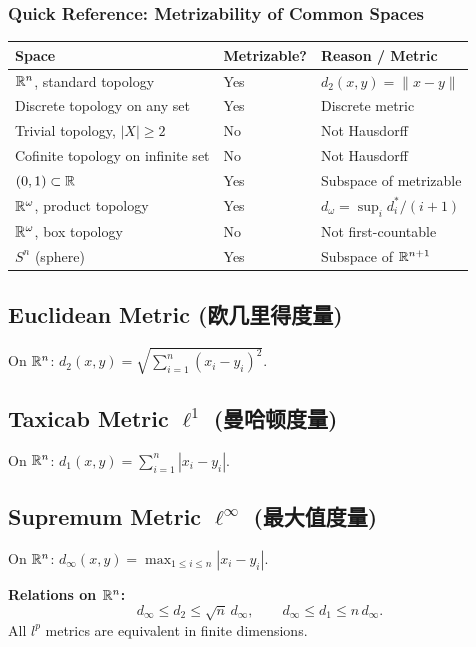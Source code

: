 \documentclass{article}
\begin{document}
\subsubsection*{Quick Reference: Metrizability of Common Spaces}

\begin{center}
  \begin{tabular}{@{}lll@{}}
    \hline
    \textbf{Space} & \textbf{Metrizable?} & \textbf{Reason / Metric} \\
    \hline
    $\mathbb{R}^n$, standard topology & Yes & $d_2(x,y) = \|x-y\|$ \\
    Discrete topology on any set & Yes & Discrete metric \\
    Trivial topology, $|X| \ge 2$ & No & Not Hausdorff \\
    Cofinite topology on infinite set & No & Not Hausdorff \\
    $(0,1) \subset \mathbb{R}$ & Yes & Subspace of metrizable \\
    $\mathbb{R}^\omega$, product topology & Yes & $d_\omega = \sup_i d^*_i/(i+1)$ \\
    $\mathbb{R}^\omega$, box topology & No & Not first-countable \\
    $S^n$ (sphere) & Yes & Subspace of $\mathbb{R}^{n+1}$ \\
    \hline
  \end{tabular}
\end{center}

\subsection{Euclidean Metric (欧几里得度量)}\label{def:euclidean}
On $\mathbb{R}^n$: $d_2(x, y) = \sqrt{\sum_{i=1}^n (x_i - y_i)^2}$.

\subsection{Taxicab Metric $\ell^1$ (曼哈顿度量)}\label{def:taxicab}
On $\mathbb{R}^n$: $d_1(x, y) = \sum_{i=1}^n |x_i - y_i|$.

\subsection{Supremum Metric $\ell^\infty$ (最大值度量)}\label{def:supremum}
On $\mathbb{R}^n$: $d_\infty(x, y) = \max_{1 \le i \le n} |x_i - y_i|$.

\textbf{Relations on $\mathbb{R}^n$:}
\[
  d_\infty \le d_2 \le \sqrt{n}\, d_\infty, \qquad d_\infty \le d_1
  \le n\, d_\infty.
\]
All $l^p$ metrics are equivalent in finite dimensions.
\end{document}
